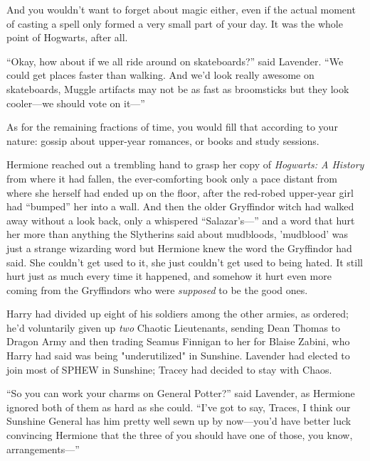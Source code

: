 And you wouldn't want to forget about magic either, even if the actual moment 
of casting a spell only formed a very small part of your day. It was the whole 
point of Hogwarts, after all.

\begin{em}
``Okay, how about if we all ride around on skateboards?'' said Lavender. 
``We could get places faster than walking. And we'd look really awesome on 
skateboards, Muggle artifacts may not be as fast as broomsticks but they look 
cooler---we should vote on it---''
\end{em}

As for the remaining fractions of time, you would fill that according to your 
nature: gossip about upper-year romances, or books and study sessions.

\begin{em}
Hermione reached out a trembling hand to grasp her copy of \emph{Hogwarts: A 
History} from where it had fallen, the ever-comforting book only a pace 
distant from where she herself had ended up on the floor, after the red-robed 
upper-year girl had ``bumped'' her into a wall. And then the older Gryffindor 
witch had walked away without a look back, only a whispered ``Salazar's---'' and 
a word that hurt her more than anything the Slytherins said about mudbloods, 
'mudblood' was just a strange wizarding word but Hermione knew the word the 
Gryffindor had said. She couldn't get used to it, she just couldn't get used to 
being hated. It still hurt just as much every time it happened, and somehow it 
hurt even more coming from the Gryffindors who were \emph{supposed} to be the 
good ones.
\end{em}

Harry had divided up eight of his soldiers among the other armies, as ordered; 
he'd voluntarily given up \emph{two} Chaotic Lieutenants, sending Dean Thomas 
to Dragon Army and then trading Seamus Finnigan to her for Blaise Zabini, who 
Harry had said was being "underutilized" in Sunshine. Lavender had elected to 
join most of SPHEW in Sunshine; Tracey had decided to stay with Chaos.

\begin{em}
``So you can work your charms on General Potter?'' said Lavender, as 
Hermione ignored both of them as hard as she could. ``I've got to say, Traces, I 
think our Sunshine General has him pretty well sewn up by now---you'd have 
better luck convincing Hermione that the three of you should have one of those, 
you know, arrangements---''
\end{em}

